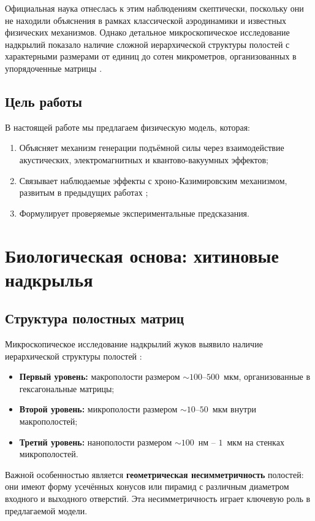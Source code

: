 \documentclass[12pt,a4paper]{article}
\begin{document}
Официальная наука отнеслась к этим наблюдениям скептически, поскольку они не находили объяснения в рамках классической аэродинамики и известных физических механизмов. Однако детальное микроскопическое исследование надкрылий показало наличие сложной иерархической структуры полостей с характерными размерами от единиц до сотен микрометров, организованных в упорядоченные матрицы \cite{grebennikov}.

\subsection{Цель работы}

В настоящей работе мы предлагаем физическую модель, которая:
\begin{enumerate}
    \item Объясняет механизм генерации подъёмной силы через взаимодействие акустических, электромагнитных и квантово-вакуумных эффектов;
    \item Связывает наблюдаемые эффекты с хроно-Казимировским механизмом, развитым в предыдущих работах \cite{chrono_casimir, fermi_1923};
    \item Формулирует проверяемые экспериментальные предсказания.
\end{enumerate}

\section{Биологическая основа: хитиновые надкрылья}

\subsection{Структура полостных матриц}

Микроскопическое исследование надкрылий жуков выявило наличие иерархической структуры полостей \cite{grebennikov}:
\begin{itemize}
    \item \textbf{Первый уровень:} макрополости размером $\sim 100$--$500$~мкм, организованные в гексагональные матрицы;
    \item \textbf{Второй уровень:} микрополости размером $\sim 10$--$50$~мкм внутри макрополостей;
    \item \textbf{Третий уровень:} нанополости размером $\sim 100$~нм -- $1$~мкм на стенках микрополостей.
\end{itemize}

Важной особенностью является \textbf{геометрическая несимметричность} полостей: они имеют форму усечённых конусов или пирамид с различным диаметром входного и выходного отверстий. Эта несимметричность играет ключевую роль в предлагаемой модели.
\end{document}
